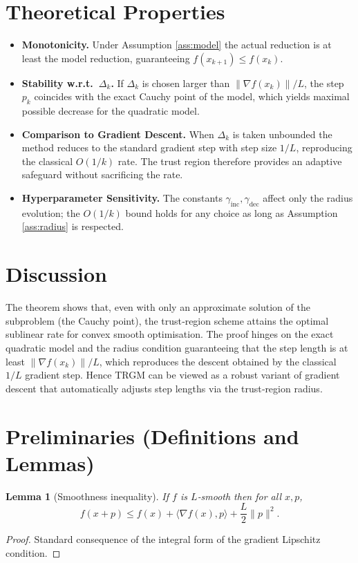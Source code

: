 \documentclass{article}
\newtheorem{lemma}{Lemma}
\begin{document}
\section*{Theoretical Properties}
\begin{itemize}
\item \textbf{Monotonicity.} Under Assumption \ref{ass:model} the actual reduction is at least the model reduction, guaranteeing $f(x_{k+1})\le f(x_k)$.
\item \textbf{Stability w.r.t.\ $\Delta_k$.} If $\Delta_k$ is chosen larger than $\|\nabla f(x_k)\|/L$, the step $p_k$ coincides with the exact Cauchy point of the model, which yields maximal possible decrease for the quadratic model.
\item \textbf{Comparison to Gradient Descent.} When $\Delta_k$ is taken unbounded the method reduces to the standard gradient step with step size $1/L$, reproducing the classical $O(1/k)$ rate. The trust region therefore provides an adaptive safeguard without sacrificing the rate.
\item \textbf{Hyperparameter Sensitivity.} The constants $\gamma_{\text{inc}},\gamma_{\text{dec}}$ affect only the radius evolution; the $O(1/k)$ bound holds for any choice as long as Assumption \ref{ass:radius} is respected.
\end{itemize}

\section*{Discussion}
The theorem shows that, even with only an approximate solution of the subproblem (the Cauchy point), the trust‑region scheme attains the optimal sublinear rate for convex smooth optimisation. The proof hinges on the exact quadratic model and the radius condition guaranteeing that the step length is at least $\|\nabla f(x_k)\|/L$, which reproduces the descent obtained by the classical $1/L$ gradient step. Hence TRGM can be viewed as a robust variant of gradient descent that automatically adjusts step lengths via the trust‑region radius.

\newpage
\section*{Preliminaries (Definitions and Lemmas)}
\begin{lemma}[Smoothness inequality]\label{lem:smooth}
If $f$ is $L$‑smooth then for all $x,p$,
\[
f(x+p)\le f(x)+\langle\nabla f(x),p\rangle+\frac{L}{2}\|p\|^{2}.
\]
\end{lemma}
\begin{proof}
Standard consequence of the integral form of the gradient Lipschitz condition. \qedhere
\end{proof}
\end{document}
